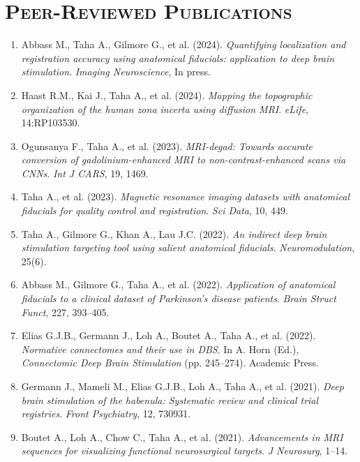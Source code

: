 \section*{\textsc{Peer-Reviewed Publications}} \noindent\hrulefill \vspace{0.5em}
\begin{enumerate}
  \item Abbass M., Taha A., Gilmore G., et al. (2024). \textit{Quantifying localization and registration accuracy using anatomical fiducials: application to deep brain stimulation}. \textit{Imaging Neuroscience}, In press.
  \item Haast R.M., Kai J., Taha A., et al. (2024). \textit{Mapping the topographic organization of the human zona incerta using diffusion MRI}. \textit{eLife}, 14:RP103530.
  \item Ogunsanya F., Taha A., et al. (2023). \textit{MRI-degad: Towards accurate conversion of gadolinium-enhanced MRI to non-contrast-enhanced scans via CNNs}. \textit{Int J CARS}, 19, 1469.
  \item Taha A., et al. (2023). \textit{Magnetic resonance imaging datasets with anatomical fiducials for quality control and registration}. \textit{Sci Data}, 10, 449.
  \item Taha A., Gilmore G., Khan A., Lau J.C. (2022). \textit{An indirect deep brain stimulation targeting tool using salient anatomical fiducials}. \textit{Neuromodulation}, 25(6).
  \item Abbass M., Gilmore G., Taha A., et al. (2022). \textit{Application of anatomical fiducials to a clinical dataset of Parkinson’s disease patients}. \textit{Brain Struct Funct}, 227, 393–405.
  \item Elias G.J.B., Germann J., Loh A., Boutet A., Taha A., et al. (2022). \textit{Normative connectomes and their use in DBS}. In A. Horn (Ed.), \textit{Connectomic Deep Brain Stimulation} (pp. 245–274). Academic Press.
  \item Germann J., Mameli M., Elias G.J.B., Loh A., Taha A., et al. (2021). \textit{Deep brain stimulation of the habenula: Systematic review and clinical trial registries}. \textit{Front Psychiatry}, 12, 730931.
  \item Boutet A., Loh A., Chow C., Taha A., et al. (2021). \textit{Advancements in MRI sequences for visualizing functional neurosurgical targets}. \textit{J Neurosurg}, 1–14.
\end{enumerate}
\vspace{1.5em}
